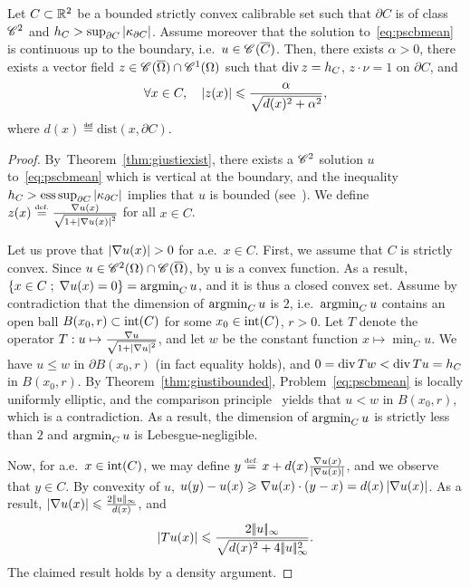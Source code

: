 \begin{prop}
  Let $C\subset \mathbb{R}^2$ be a bounded strictly convex calibrable set such that $\partial C$ is of class $\mathscr{C}^{2}$ 
  and $h_C >\sup_{\partial C} \left| \kappa_{\partial C} \right|$. 
  Assume moreover that the solution to~\eqref{eq:pscbmean} is continuous up to the boundary, i.e.\ $u\in \mathscr{C}^{}(\overline{C})$.
Then, there exists $\alpha>0$, there exists a vector field $z\in \mathscr{C}^{}(\overline{\Omega})\cap \mathscr{C}^{1}(\Omega)$ such that $\operatorname{div} z= h_C$, $z\cdot \nu =1$ on $\partial C$, and
  \begin{equation*}
    \forall x\in C, \quad \left| z(x) \right|\leqslant \frac{\alpha}{\sqrt{d(x)^2+ \alpha^2}}, 
  \end{equation*}
  where $d(x)\eqdef \mathrm{dist}(x,\partial C)$.
\end{prop}
\begin{proof}

  By~Theorem~\ref{thm:giustiexist}, there exists a $\mathscr{C}^{2}$ solution $u$ to~\eqref{eq:pscbmean} which is vertical at the boundary, and the inequality $h_C > \operatorname{ess} \sup_{\partial C} \left| \kappa_{\partial C} \right|$ implies that $u$ is bounded (see~\cite[Th. 3.1]{giusti78}). We define $z(x)\stackrel{\mbox{\upshape\tiny def.}}{=} \frac{\nabla u(x)}{\sqrt{1+\left| \nabla u(x) \right|^2}}$ for all $x\in C$. 

  Let us prove that $\abs{\nabla u(x)}>0$ for a.e.\ $x\in C$.
  First, we assume that $C$ is strictly convex. Since $u\in  \mathscr{C}^{2}{(\Omega)}\cap\mathscr{C}^{}{(\overline{\Omega})}$, by \cite[Th.~2.2]{korevaar1983convex} u is a convex function. As a result, $\left\{ x\in C \;;\; \nabla u(x)=0 \right\}=\operatorname{argmin}_C u$, and it is thus a closed convex set. Assume by contradiction that the dimension of $\operatorname{argmin}_C u$ is $2$, i.e.\ $\operatorname{argmin}_C u$ contains an open ball $B(x_0,r) \subset \operatorname{int}(C)$ for some $x_0\in \operatorname{int}(C)$, $r>0$. Let $T$ denote the operator $T:u\mapsto \frac{\nabla u}{\sqrt{1+\left| \nabla u \right|^2}}$, and let $w$ be the constant function $x\mapsto \min_C u$.  We have $u\leq w$ in $\partial B(x_0,r)$ (in fact equality holds), and $0=\operatorname{div} Tw< \operatorname{div} Tu=h_C$ in $B(x_0,r)$. By Theorem~\ref{thm:giustibounded}, Problem~\eqref{eq:pscbmean} is locally uniformly elliptic, and the comparison principle~\cite[Th.~10.1]{gilbarg1977elliptic} yields that $u<w$ in $B(x_0,r)$, which is a contradiction. As a result, the dimension of $\operatorname{argmin}_C u$ is strictly less than $2$ and $\operatorname{argmin}_C u$ is Lebesgue-negligible.

  Now, for a.e.\ $x\in \operatorname{int}(C)$, we may define $y\stackrel{\mbox{\upshape\tiny def.}}{=} x+d(x)\frac{\nabla u(x)}{\left| \nabla u(x) \right|}$, and we observe that $y\in C$. By convexity of $u$, $u(y)-u(x)\geqslant \nabla u(x)\cdot(y-x)=d(x)\left| \nabla u(x) \right|$. As a result, $\left| \nabla u(x) \right|\leqslant \frac{2|\!| u |\!|_{\infty}}{d(x)}$, and
  \begin{equation*}
    \left| Tu(x) \right|\leqslant \frac{2|\!| u |\!|_{\infty}}{\sqrt{d(x)^2+4|\!| u |\!|_{\infty}^2}}. 
  \end{equation*}
The claimed result holds by a density argument.  
\end{proof}

